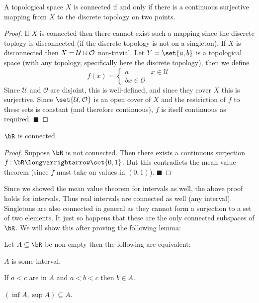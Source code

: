 \documentclass[10pt]{article}
\def\qed{\hskip1cm\penalty-100\hbox{}\hfill$\blacksquare$}
\def\mU{\mathcal{U}}
\def\mO{\mathcal{O}}
\def\longto{\longvarrightarrow}
\begin{document}
\begin{prop*}

    A topological space $X$ is connected if and only if there is a continuous surjective mapping from $X$ to the discrete topology on two points.

\end{prop*}

\begin{proof}

    If $X$ is connected then there cannot exist such a mapping since the discrete toplogy is disconnected (if the discrete topology is not on a singleton).
    If $X$ is disconnected then $X=\mU\dcup\mO$ non-trivial.
    Let $Y=\set{a,b}$ is a topological space (with any topology, specifically here the discrete topology), then we define
    \[ f(x) = \begin{cases} a & x\in\mU \\ b x\in\mO \end{cases} \]
    Since $\mU$ and $\mO$ are disjoint, this is well-defined, and since they cover $X$ this is surjective.
    Since $\set{\mU, \mO}$ is an open cover of $X$ and the restriction of $f$ to these sets is constant (and therefore continuous), $f$ is itself continuous as required.
    \qed

\end{proof}

\begin{thrm*}

    $\bR$ is connected.

\end{thrm*}

\begin{proof}

    Suppose $\bR$ is not connected.
    Then there exists a continuous surjection $f\colon\bR\longto\set{0,1}$.
    But this contradicts the mean value theorem (since $f$ must take on values in $(0,1)$).
    \qed

\end{proof}

Since we showed the mean value theorem for intervals as well, the above proof holds for intervals.
Thus real intervals are connected as well (any interval).
Singletons are also connected in general as they cannot form a surjection to a set of two elements.
It just so happens that these are the only connected subspaces of $\bR$.
We will show this after proving the following lemma:

\begin{lemm*}

    Let $A\subseteq\bR$ be non-empty then the following are equivalent:
    \benum
        \item $A$ is some interval.
        \item If $a<c$ are in $A$ and $a<b<c$ then $b\in A$.
        \item $(\inf A,\sup A)\subseteq A$.
    \eenum

\end{lemm*}
\end{document}
